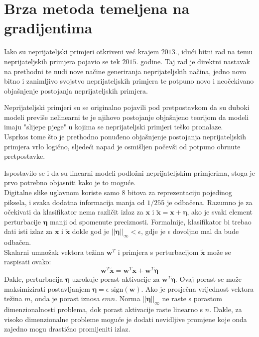 \documentclass[utf8, diplomski]{fer}
\begin{document}
\section{Brza metoda temeljena na gradijentima}\label{fgm}
Iako su neprijateljski primjeri otkriveni već krajem $2013.$, idući bitni rad na temu neprijateljskih primjera pojavio se tek $2015.$ godine\citep{Goodfellow2015ExplainingAH}. Taj rad je direktni nastavak na prethodni te nudi nove načine generiranja neprijateljskih načina, jedno novo bitno i zanimljivo svojstvo neprijateljskih primjera te potpuno novo i neočekivano objašnjenje postojanja neprijateljskih primjera.
\par
Neprijateljski primjeri su se originalno pojavili pod pretpostavkom da su duboki modeli previše nelinearni te je njihovo postojanje objašnjeno teorijom da modeli imaju "slijepe pjege" u kojima se neprijateljski primjeri teško pronalaze. \\
Usprkos tome što je prethodno ponuđeno objašnjenje postojanja neprijateljskih primjera vrlo logično, sljedeći napad je osmišljen počevši od potpuno obrnute pretpostavke.
\par
Ispostavilo se i da su linearni modeli podložni neprijateljskim primjerima, stoga je prvo potrebno objasniti kako je to moguće. \\
Digitalne slike uglavnom koriste samo 8 bitova za reprezentaciju pojedinog piksela, i svaka dodatna informacija manja od $1/255$ je odbačena. Razumno je za očekivati da klasifikator nema različit izlaz za $\boldsymbol{x}$ i $\boldsymbol{\tilde{x}} = \boldsymbol{x} + \boldsymbol{\eta}$, ako je svaki element perturbacije $\boldsymbol{\eta}$ manji od spomenute preciznosti. Formalnije, klasifikator bi trebao dati isti izlaz za $\boldsymbol{x}$ i $\boldsymbol{\tilde{x}}$ dokle god je $||\boldsymbol{\eta}||_{\infty} < \epsilon$, gdje je $\epsilon$ dovoljno mal da bude odbačen. \\
Skalarni umnožak vektora težina $\boldsymbol{w}^{T}$ i primjera s perturbacijom $\boldsymbol{\tilde{x}}$ može se raspisati ovako:
\begin{equation}
	\boldsymbol{w}^{T}\boldsymbol{\tilde{x}} = \boldsymbol{w}^{T}\boldsymbol{x} + \boldsymbol{w}^{T}\boldsymbol{\eta}
\end{equation}
Dakle, perturbacija $\boldsymbol{\eta}$ uzrokuje porast aktivacije za $\boldsymbol{w}^{T}\boldsymbol{\eta}$. Ovaj porast se može maksimizirati postavljanjem $\boldsymbol{\eta} = \epsilon \text{ sign}(\boldsymbol{w})$. Ako je prosječna vrijednost vektora težina $m$, onda je porast iznosa $\epsilon mn$. Norma $||\boldsymbol{\eta}||_{\infty}$ ne raste s porastom dimenzionalnosti problema, dok porast aktivacije raste linearno s $n$. Dakle, za visoko dimenzionalne probleme moguće je dodati nevidljive promjene koje onda zajedno mogu drastično promijeniti izlaz.
\end{document}
